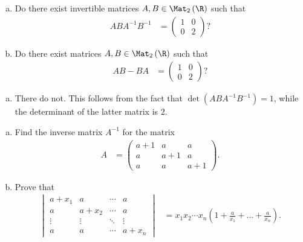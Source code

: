 \documentclass[10pt]{mypackage}
\begin{document}
\begin{problem}[Problem 4]\hfill
  \begin{enumerate}[(a)]
    \item Do there exist invertible matrices $A,B\in \Mat_{2}\left( \R \right)$ such that
      \begin{align*}
        ABA^{-1}B^{-1} &= \begin{pmatrix}1 & 0 \\ 0 & 2\end{pmatrix}?
      \end{align*}
    \item Do there exist matrices $A,B\in \Mat_{2}\left( \R \right)$ such that
      \begin{align*}
        AB - BA &= \begin{pmatrix}1 & 0 \\ 0 & 2\end{pmatrix}?
      \end{align*}
  \end{enumerate}
\end{problem}
\begin{solution}\hfill
  \begin{enumerate}[(a)]
    \item There do not. This follows from the fact that $\det\left( ABA^{-1}B^{-1} \right) = 1$, while the determinant of the latter matrix is $2$.
  \end{enumerate}
\end{solution}
\begin{problem}[Problem 5]\hfill
  \begin{enumerate}[(a)]
    \item Find the inverse matrix $A^{-1}$ for the matrix
      \begin{align*}
        A &= \begin{pmatrix}a+1 & a & a \\ a & a+1 & a \\ a & a & a+1\end{pmatrix}.
      \end{align*}
    \item Prove that
      \begin{align*}
        \begin{vmatrix}a + x_1 & a & \cdots & a \\ a & a + x_2 & \cdots & a \\ \vdots & \vdots & \ddots & \vdots \\ a & a & \cdots & a + x_n\end{vmatrix} &= x_1x_2\cdots x_n\left( 1 + \frac{a}{x_1} + \dots + \frac{a}{x_n} \right).
      \end{align*}
  \end{enumerate}
\end{problem}
\end{document}
